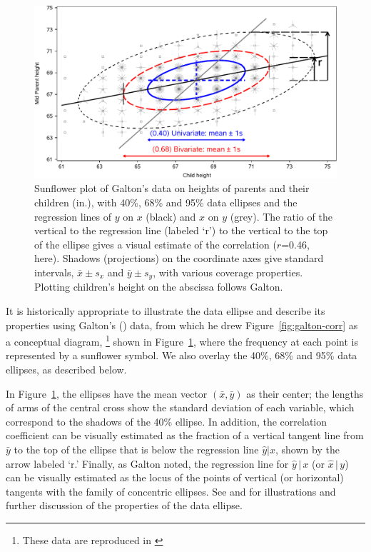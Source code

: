\documentclass[11pt]{article}%
\newcommand*{\figref}[1]{Figure~\ref{#1}}
\newcommand*{\given}{\ensuremath{\, | \,}}
\begin{document}
\begin{figure}[htb]
  \centering
  \includegraphics[width=.9\textwidth,clip]{fig/galton-reg3}
  \caption{Sunflower plot of Galton's data on heights of parents and their children (in.), with
  40\%, 68\% and 95\% data ellipses and the regression lines of $y$ on $x$ (black) and
  $x$ on $y$ (grey). The ratio of the vertical to the regression line (labeled `r') to the vertical
  to the top of the ellipse gives a visual estimate of the correlation ($r$=0.46, here).
  Shadows (projections) on the coordinate axes give standard intervals,
  $\bar{x} \pm s_x$ and $\bar{y} \pm s_y$, with various coverage properties.
  Plotting children's height on the abscissa follows Galton.
  }%
  \label{fig:galton-reg3}
\end{figure}

It is historically appropriate to illustrate the data ellipse and
describe its properties using Galton's (\citeyear[Table
I]{Galton:1886})
data, from which he drew \figref{fig:galton-corr} as a conceptual
diagram,%
\footnote{These data are reproduced in \citet[Table 8.2, p.
286]{Stigler:1986}}
shown in \figref{fig:galton-reg3}, where the frequency at
each point is represented by a sunflower symbol. We also overlay the 40\%,
68\% and 95\% data ellipses, as described below.

In \figref{fig:galton-reg3}, the ellipses have the mean vector
$(\bar{x}, \bar{y})$ as their center;  the lengths of arms of the
central cross show the standard deviation of each variable, which
correspond to the shadows of the 40\% ellipse.  In
addition, the correlation coefficient can be visually estimated as
the fraction of a vertical tangent line from $\bar{y}$ to the top of
the ellipse that is below the regression line $\hat{y} | x$, shown
by the arrow labeled `r.' Finally, as Galton noted, the regression line
for $\hat{y} \given x$ (or $\hat{x} \given y$)
can be visually estimated as the locus of the points of vertical
(or horizontal) tangents with the family of concentric ellipses.
See \citet[Figs.~5.1--5.2]{Monette:90} and
\citet[p.~183]{Friendly:91} for illustrations and further discussion
of the properties of the data ellipse.
\end{document}
